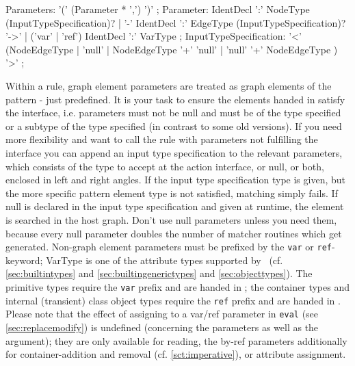 \begin{rail}
  Parameters: '(' (Parameter * ',') ')' ;
  Parameter: IdentDecl ':' NodeType (InputTypeSpecification)? | '-' IdentDecl ':' EdgeType (InputTypeSpecification)? '->' | ('var' | 'ref') IdentDecl ':' VarType ;
  InputTypeSpecification: '<' (NodeEdgeType | 'null' | NodeEdgeType '+' 'null' | 'null' '+' NodeEdgeType ) '>' ;
\end{rail}

Within a rule, graph element parameters are treated as graph elements of the pattern - just predefined.
It is your task to ensure the elements handed in satisfy the interface, i.e. parameters must not be null and must be of the type specified or a subtype of the type specified (in contrast to some old versions).
If you need more flexibility and want to call the rule with parameters not fulfilling the interface you can append an input type specification to the relevant parameters, which consists of the type to accept at the action interface, or null, or both, enclosed in left and right angles.
If the input type specification type is given, but the more specific pattern element type is not satisfied, matching simply fails.
If null is declared in the input type specification and given at runtime, the element is searched in the host graph.
Don't use null parameters unless you need them, because every null parameter doubles the number of matcher routines which get generated.
Non-graph element parameters must be prefixed by the \texttt{var} or \texttt{ref}-keyword;
VarType is one of the attribute types supported by \GrG\ (cf. \ref{sec:builtintypes} and \ref{sec:builtingenerictypes} and \ref{sec:objecttypes}).
The primitive types require the \texttt{var} prefix and are handed in ;
the container types and internal (transient) class object types require the \texttt{ref} prefix and are handed in .
Please note that the effect of assigning to a var/ref parameter in \texttt{eval} (see \ref{sec:replacemodify}) is undefined (concerning the parameters as well as the argument);
they are only available for reading, the by-ref parameters additionally for container-addition and removal (cf. \ref{sct:imperative}), or attribute assignment.

